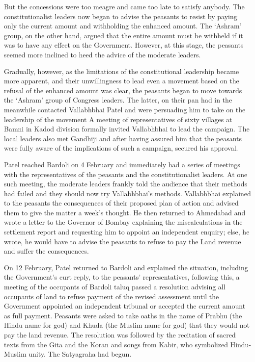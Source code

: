 But the concessions were too meagre and came too late to satisfy anybody. The constitutionalist leaders now began to advise the peasants to resist by paying only the current amount and withholding the enhanced amount. The `Ashram' group, on the other hand, argued that the entire amount must be withheld if it was to have any effect on the Government. However, at this stage, the peasants seemed more inclined to heed the advice of the moderate leaders.

Gradually, however, as the limitations of the constitutional leadership became more apparent, and their unwillingness to lead even a movement based on the refusal of the enhanced amount was clear, the peasants began to move towards the `Ashram' group of Congress leaders. The latter, on their pan had in the meanwhile contacted Vallabhbhai Patel and were persuading him to take on the leadership of the movement A meeting of representatives of sixty villages at Bamni in Kadod division formally invited Vallabhbhai to lead the campaign. The local leaders also met Gandhiji and after having assured him that the peasants were fully aware of the implications of such a campaign, secured his approval.

Patel reached Bardoli on 4 February and immediately had a series of meetings with the representatives of the peasants and the constitutionalist leaders. At one such meeting, the moderate leaders frankly told the audience that their methods had failed and they should now try Vallabhbhai's methods. Vallabhbhai explained to the peasants the consequences of their proposed plan of action and advised them to give the matter a week's thought. He then returned to Ahmedabad and wrote a letter to the Governor of Bombay explaining the miscalculations in the settlement report and requesting him to appoint an independent enquiry; else, he wrote, he would have to advise the peasants to refuse to pay the Land revenue and suffer the consequences.

On 12 February, Patel returned to Bardoli and explained the situation, including the Government's curt reply, to the peasants' representatives, following this, a meeting of the occupants of Bardoli taluq passed a resolution advising all occupants of land to refuse payment of the revised assessment until the Government appointed an independent tribunal or accepted the current amount as full payment. Peasants were asked to take oaths in the name of Prabhu (the Hindu name for god) and Khuda (the Muslim name for god) that they would not pay the land revenue. The resolution was followed by the recitation of sacred texts from the Gita and the Koran and songs from Kabir, who symbolized Hindu-Muslim unity. The Satyagraha had begun.


